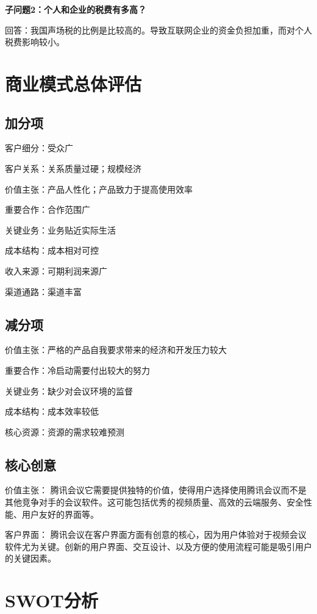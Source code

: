 \documentclass[a4paper,12pt]{article}
\begin{document}
    \textbf{子问题2：个人和企业的税费有多高？}

    回答：我国声场税的比例是比较高的。导致互联网企业的资金负担加重，而对个人税费影响较小。

    \section{商业模式总体评估}
    \subsection{加分项}
    客户细分：受众广
    
    客户关系：关系质量过硬；规模经济
    
    价值主张：产品人性化；产品致力于提高使用效率
    
    重要合作：合作范围广
    
    关键业务：业务贴近实际生活
    
    成本结构：成本相对可控
    
    收入来源：可期利润来源广
    
    渠道通路：渠道丰富
    
    \subsection{减分项}
    价值主张：严格的产品自我要求带来的经济和开发压力较大
    
    重要合作：冷启动需要付出较大的努力
    
    关键业务：缺少对会议环境的监督
    
    成本结构：成本效率较低
    
    核心资源：资源的需求较难预测

    \subsection{核心创意}

    价值主张： 腾讯会议它需要提供独特的价值，使得用户选择使用腾讯会议而不是其他竞争对手的会议软件。这可能包括优秀的视频质量、高效的云端服务、安全性能、用户友好的界面等。
    
    客户界面： 腾讯会议在客户界面方面有创意的核心，因为用户体验对于视频会议软件尤为关键。创新的用户界面、交互设计、以及方便的使用流程可能是吸引用户的关键因素。
    

    \section{SWOT分析}
\end{document}
